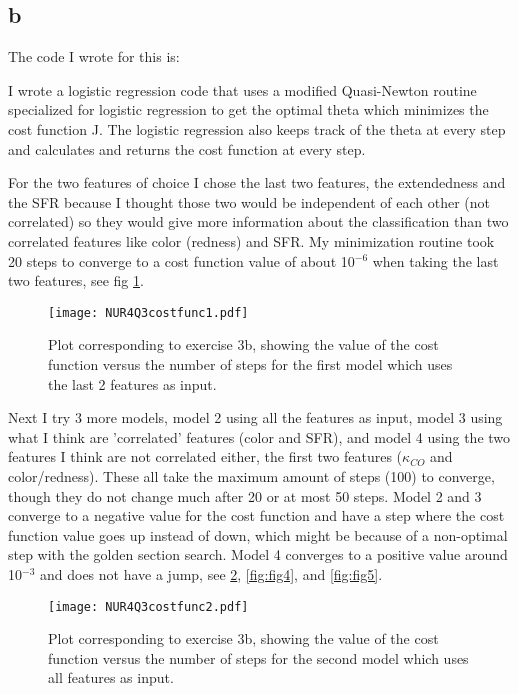 \subsection*{b}

The code I wrote for this is:


I wrote a logistic regression code that uses a modified Quasi-Newton routine specialized for logistic regression to get the optimal theta which minimizes the cost function J. The logistic regression also keeps track of the theta at every step and calculates and returns the cost function at every step.

For the two features of choice I chose the last two features, the extendedness and the SFR because I thought those two would be independent of each other (not correlated) so they would give more information about the classification than two correlated features like color (redness) and SFR. 
My minimization routine took 20 steps to converge to a cost function value of about 10$^{-6}$ when taking the last two features, see fig \ref{fig:fig2}.

\begin{figure}[h!]
  \centering
  \texttt{[image: NUR4Q3costfunc1.pdf]}
  \caption{Plot corresponding to exercise 3b, showing the value of the cost function versus the number of steps for the first model which uses the last 2 features as input.}
  \label{fig:fig2}
\end{figure} 

Next I try 3 more models, model 2 using all the features as input, model 3 using what I think are 'correlated' features (color and SFR), and model 4 using the two features I think are not correlated either, the first two features ($\kappa_{CO}$ and color/redness). 
These all take the maximum amount of steps (100) to converge, though they do not change much after 20 or at most 50 steps. 
Model 2 and 3 converge to a negative value for the cost function and have a step where the cost function value goes up instead of down, which might be because of a non-optimal step with the golden section search. Model 4 converges to a positive value around 10$^{-3}$ and does not have a jump, see \ref{fig:fig3}, \ref{fig:fig4}, and \ref{fig:fig5}.


\begin{figure}[h!]
  \centering
  \texttt{[image: NUR4Q3costfunc2.pdf]}
  \caption{Plot corresponding to exercise 3b, showing the value of the cost function versus the number of steps for the second model which uses all features as input.}
  \label{fig:fig3}
\end{figure} 


